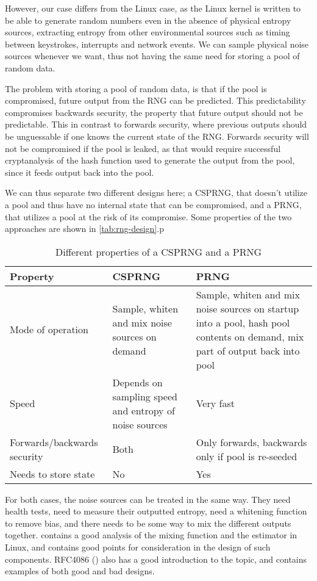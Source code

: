 However, our case differs from the Linux case, as the Linux kernel is written to be able to generate random numbers even in the absence of physical entropy sources, extracting entropy from other environmental sources such as timing between keystrokes, interrupts and network events. We can sample physical noise sources whenever we want, thus not having the same need for storing a pool of random data.

The problem with storing a pool of random data, is that if the pool is compromised, future output from the RNG can be predicted. This predictability compromises backwards security, the property that future output should not be predictable. This in contrast to forwards security, where previous outputs should be unguessable if one knows the current state of the RNG. Forwards security will not be compromised if the pool is leaked, as that would require successful cryptanalysis of the hash function used to generate the output from the pool, since it feeds output back into the pool.

We can thus separate two different designs here; a CSPRNG, that doesn't utilize a pool and thus have no internal state that can be compromised, and a PRNG, that utilizes a pool at the risk of its compromise. Some properties of the two approaches are shown in \autoref{tab:rng-design}.p

\begin{table}
\centering
    \begin{tabular}{| l | p{3cm} | p{3cm} |}
    \hline
    \textbf{Property} & \textbf{CSPRNG} & \textbf{PRNG} \\ \hline
    Mode of operation & Sample, whiten and mix noise sources on demand & Sample, whiten and mix noise sources on startup into a pool, hash pool contents on demand, mix part of output back into pool \\ \hline
    Speed & Depends on sampling speed and entropy of noise sources & Very fast \\ \hline
    Forwards/backwards security & Both & Only forwards, backwards only if pool is re-seeded \\ \hline
    Needs to store state & No & Yes \\ \hline
    \end{tabular}
    \caption{Different properties of a CSPRNG and a PRNG}\label{tab:rng-design}
\end{table}

For both cases, the noise sources can be treated in the same way. They need health tests, need to measure their outputted entropy, need a whitening function to remove bias, and there needs to be some way to mix the different outputs together. \cite{linux-prng-revisited} contains a good analysis of the mixing function and the estimator in Linux, and contains good points for consideration in the design of such components. RFC4086 (\cite{rfc4086}) also has a good introduction to the topic, and contains examples of both good and bad designs.

